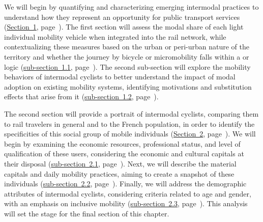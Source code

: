 \begin{refsegment}
We will begin by quantifying and characterizing emerging intermodal practices to understand how they represent an opportunity for public transport services (\hyperref[section-chap4:progression-velo-micromobilite-aubaine]{Section~1}, page~\pageref{section-chap4:progression-velo-micromobilite-aubaine}). The first section will assess the modal share of each light individual mobility vehicle when integrated into the rail network, while contextualizing these measures based on the urban or \gls{peri-urban} nature of the territory and whether the journey by bicycle or micromobility falls within a  or  logic (\hyperref[chap4:proportion-croissante-voyageurs-intermodaux]{sub-section~1.1}, page~\pageref{chap4:proportion-croissante-voyageurs-intermodaux}). The second sub-section will explore the mobility behaviors of intermodal cyclists to better understand the impact of modal adoption on existing mobility systems, identifying motivations and substitution effects that arise from it (\hyperref[chap4:comportements-mobilite]{sub-section~1.2}, page~\pageref{chap4:comportements-mobilite}).

The second section will provide a portrait of intermodal cyclists, comparing them to rail travelers in general and to the French population, in order to identify the specificities of this social group of mobile individuals (\hyperref[section-chap4:profil-sociodemographique]{Section~2}, page~\pageref{section-chap4:profil-sociodemographique}). We will begin by examining the economic resources, professional status, and level of qualification of these users, considering the economic and cultural capitals at their disposal (\hyperref[chap4:capital-economique-culturel]{sub-section~2.1}, page~\pageref{chap4:capital-economique-culturel}). Next, we will describe the material capitals and daily mobility practices, aiming to create a snapshot of these individuals (\hyperref[chap4:capital-mobilite]{sub-section~2.2}, page~\pageref{chap4:capital-mobilite}). Finally, we will address the demographic attributes of intermodal cyclists, considering criteria related to age and \gls{gender}, with an emphasis on inclusive mobility (\hyperref[chap4:demographie]{sub-section~2.3}, page~\pageref{chap4:demographie}). This analysis will set the stage for the final section of this chapter.


\end{refsegment}
